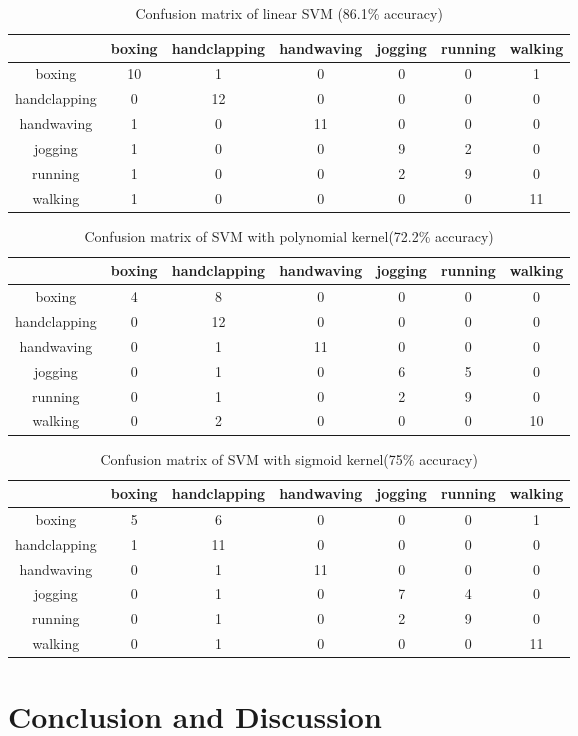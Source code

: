 \documentclass{article}
\begin{document}
\begin{table}
\caption{Confusion matrix of linear SVM (86.1\% accuracy)}
\begin{center}
\begin{tabular}{c|cccccc}\hline
&boxing&handclapping &handwaving &jogging &running &walking\\ \hline
boxing&10& 1& 0& 0& 0& 1\\
handclapping&0& 12& 0& 0& 0& 0\\
handwaving&1& 0& 11&0 &0 &0 \\
jogging&1& 0& 0&9 &2 &0 \\
running&1& 0&0 &2 &9 &0 \\
walking&1&0 &0 &0 &0 &11 \\ \hline
\end{tabular}
\end{center}
\end{table} 

\begin{table}
\caption{Confusion matrix of SVM with polynomial kernel(72.2\% accuracy)}
\begin{center}
\begin{tabular}{c|cccccc}\hline
&boxing&handclapping &handwaving &jogging &running &walking\\ \hline
boxing&4& 8& 0& 0& 0& 0\\
handclapping&0& 12& 0& 0& 0& 0\\
handwaving&0& 1& 11&0 &0 &0 \\
jogging&0& 1& 0&6 &5 &0 \\
running&0& 1&0&2 &9 &0 \\
walking&0&2 &0 &0 &0 &10 \\ \hline
\end{tabular}
\end{center}
\end{table} 

\begin{table}
\caption{Confusion matrix of SVM with sigmoid kernel(75\% accuracy)}
\begin{center}
\begin{tabular}{c|cccccc}\hline
&boxing&handclapping &handwaving &jogging &running &walking\\ \hline
boxing&5& 6& 0& 0& 0& 1\\
handclapping&1& 11& 0& 0& 0& 0\\
handwaving&0& 1& 11&0 &0 &0 \\
jogging&0& 1& 0&7 &4 &0 \\
running&0& 1&0&2 &9 &0 \\
walking&0&1 &0 &0 &0 &11 \\ \hline
\end{tabular}
\end{center}
\end{table} 
\section{Conclusion and Discussion}
\end{document}
